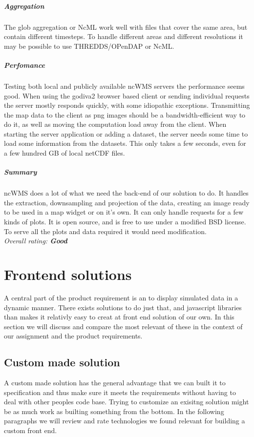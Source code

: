 \documentclass[11pt,a4paper,titlepage,oneside]{report}
\begin{document}
    \paragraph{Aggregation}
    The glob aggregation or NcML work well with files that cover the same area, but contain different timesteps. To handle different areas and different resolutions it may be possible to use THREDDS/OPenDAP or NcML.
    \paragraph{Perfomance}
    Testing both local and publicly available ncWMS servers the performance seems good. When using the godiva2 browser based client or sending individual requests the server mostly responds quickly, with some idiopathic exceptions. Transmitting the map data to the client as png images should be a bandwidth-efficient way to do it, as well as moving the computation load away from the client. When starting the server application or adding a dataset, the server needs some time to load some information from the datasets. This only takes a few seconds, even for a few hundred GB of local netCDF files.
    \paragraph{Summary}
    ncWMS does a lot of what we need the back-end of our solution to do. It handles the extraction, downsampling and projection of the data, creating an image ready to be used in a map widget or on it’s own. It can only handle requests for a few kinds of plots. It is open source, and is free to use under a modified BSD license. To serve all the plots and data required it would need modification.
  \\ \emph{Overall rating: \textbf{Good}}


  
\chapter{Frontend solutions}
  A central part of the product requirement is an to display simulated data in a dynamic manner. There exists solutions to do just that, and javascript libraries than makes it relativly easy to creat at front end solution of our own. In this section we will discuss and compare the most relevant of these in the context of our assignment and the product requirements. 
  \section{Custom made solution}
    A custom made solution has the general advantage that we can built it to specification and thus make sure it meets the requirements without having to deal with other peoples code base. Trying to customize an exisitng solution might be as much work as builting something from the bottom. In the following paragraphs we will review and rate technologies we found relevant for building a custom front end.
\end{document}

